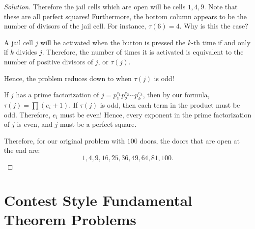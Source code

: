 \begin{proof}[Solution]
\clearpage

Therefore the jail cells which are open will be cells $1, 4, 9$. Note that these are all perfect squares! Furthermore, the bottom column appears to be the number of divisors of the jail cell. For instance, $\tau(6)=4$.  Why is this the case?

A jail cell $j$ will be activated when the button is pressed the $k$-th time if and only if $k$ divides $j$. Therefore, the number of times it is activated is equivalent to the number of positive divisors of $j$, or $\tau(j)$.

Hence, the problem reduces down to when $\tau(j)$ is odd!

\clearpage

If $j$ has a prime factorization of $j=p_1^{e_1}p_2^{e_2}\cdots p_k^{e_k}$, then by our formula, $\tau(j)=\prod (e_i+1)$. If $\tau(j)$ is odd, then each term in the product must be odd. Therefore, $e_i$ must be even! Hence, every exponent in the prime factorization of $j$ is even, and $j$ must be a perfect square.

Therefore, for our original problem with $100$ doors, the doors that are open at the end are: $$1, 4, 9, 16, 25, 36, 49, 64, 81, 100.$$  \end{proof}

	


\section{Contest Style Fundamental Theorem Problems}


\clearpage
